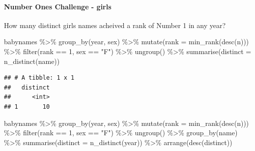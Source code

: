 \documentclass[
]{article}
\newenvironment{Shaded}{\begin{snugshade}}{\end{snugshade}}
\newcommand{\AttributeTok}[1]{\textcolor[rgb]{0.77,0.63,0.00}{#1}}
\newcommand{\DecValTok}[1]{\textcolor[rgb]{0.00,0.00,0.81}{#1}}
\newcommand{\FunctionTok}[1]{\textcolor[rgb]{0.00,0.00,0.00}{#1}}
\newcommand{\NormalTok}[1]{#1}
\newcommand{\SpecialCharTok}[1]{\textcolor[rgb]{0.00,0.00,0.00}{#1}}
\newcommand{\StringTok}[1]{\textcolor[rgb]{0.31,0.60,0.02}{#1}}
\begin{document}
\hypertarget{number-ones-challenge---girls}{%
\paragraph{Number Ones Challenge -
girls}\label{number-ones-challenge---girls}}

How many distinct girls names acheived a rank of Number 1 in any year?

\begin{Shaded}
\begin{Highlighting}[]
\NormalTok{babynames }\SpecialCharTok{\%\textgreater{}\%} 
  \FunctionTok{group\_by}\NormalTok{(year, sex) }\SpecialCharTok{\%\textgreater{}\%} 
  \FunctionTok{mutate}\NormalTok{(}\AttributeTok{rank =} \FunctionTok{min\_rank}\NormalTok{(}\FunctionTok{desc}\NormalTok{(n))) }\SpecialCharTok{\%\textgreater{}\%} 
  \FunctionTok{filter}\NormalTok{(rank }\SpecialCharTok{==} \DecValTok{1}\NormalTok{, sex }\SpecialCharTok{==} \StringTok{"F"}\NormalTok{) }\SpecialCharTok{\%\textgreater{}\%} 
  \FunctionTok{ungroup}\NormalTok{() }\SpecialCharTok{\%\textgreater{}\%} 
  \FunctionTok{summarise}\NormalTok{(}\AttributeTok{distinct =} \FunctionTok{n\_distinct}\NormalTok{(name))}
\end{Highlighting}
\end{Shaded}

\begin{verbatim}
## # A tibble: 1 x 1
##   distinct
##      <int>
## 1       10
\end{verbatim}

\begin{Shaded}
\begin{Highlighting}[]
\NormalTok{babynames }\SpecialCharTok{\%\textgreater{}\%} 
  \FunctionTok{group\_by}\NormalTok{(year, sex) }\SpecialCharTok{\%\textgreater{}\%} 
  \FunctionTok{mutate}\NormalTok{(}\AttributeTok{rank =} \FunctionTok{min\_rank}\NormalTok{(}\FunctionTok{desc}\NormalTok{(n))) }\SpecialCharTok{\%\textgreater{}\%} 
  \FunctionTok{filter}\NormalTok{(rank }\SpecialCharTok{==} \DecValTok{1}\NormalTok{, sex }\SpecialCharTok{==} \StringTok{"F"}\NormalTok{) }\SpecialCharTok{\%\textgreater{}\%} 
  \FunctionTok{ungroup}\NormalTok{() }\SpecialCharTok{\%\textgreater{}\%} 
  \FunctionTok{group\_by}\NormalTok{(name) }\SpecialCharTok{\%\textgreater{}\%}
  \FunctionTok{summarise}\NormalTok{(}\AttributeTok{distinct =} \FunctionTok{n\_distinct}\NormalTok{(year)) }\SpecialCharTok{\%\textgreater{}\%}
  \FunctionTok{arrange}\NormalTok{(}\FunctionTok{desc}\NormalTok{(distinct))}
\end{Highlighting}
\end{Shaded}
\end{document}
